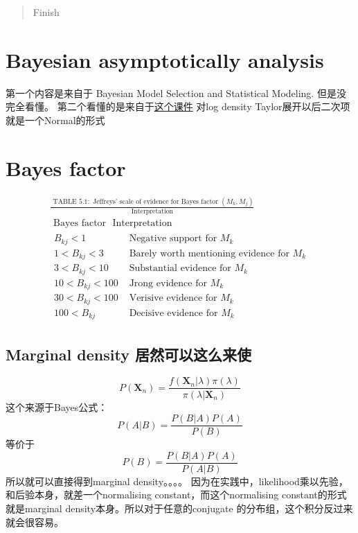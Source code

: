 \documentclass[
]{book}
\theoremstyle{definition}
\theoremstyle{definition}
\theoremstyle{definition}
\theoremstyle{remark}
\begin{document}
\begin{quote}
Finish
\end{quote}

\hypertarget{bayesian-asymptotically-analysis}{%
\section{Bayesian asymptotically analysis}\label{bayesian-asymptotically-analysis}}

第一个内容是来自于 Bayesian Model Selection and Statistical Modeling.
但是没完全看懂。
第二个看懂的是来自于\href{https://www.stat.unipd.it/sites/default/files/bayesian-mod2.pdf}{这个课件} 对log density Taylor展开以后二次项就是一个Normal的形式

\hypertarget{bayes-factor}{%
\section{Bayes factor}\label{bayes-factor}}

\[
\begin{array}{c}{\frac{\text { TABLE } 5.1: \text { Jeffreys' scale of evidence for Bayes factor }\left(M_{k}, M_{j}\right)}{\text { Interpretation }}} \\ {\text { Bayes factor }} {\text { Interpretation }} \\ {\begin{array}{cc}{B_{k j}<1} & {\text { Negative support for } M_{k}} \\ {1<B_{k j}<3} & {\text { Barely worth mentioning evidence for } M_{k}} \\ {3<B_{k j}<10} & {\text { Substantial evidence for } M_{k}} \\ {10<B_{k j}<100} & {\text { Jrong evidence for } M_{k}} \\ {30<B_{k j}<100} & {\text { Verisive evidence for } M_{k}} \\ {100<B_{k j}} & {\text { Decisive evidence for } M_{k}}\end{array}}\end{array}
\]

\hypertarget{marginal-density-ux5c45ux7136ux53efux4ee5ux8fd9ux4e48ux6765ux4f7f}{%
\subsection{Marginal density 居然可以这么来使}\label{marginal-density-ux5c45ux7136ux53efux4ee5ux8fd9ux4e48ux6765ux4f7f}}

\[
P\left(\boldsymbol{X}_{n}\right)=\frac{f\left(\boldsymbol{X}_{n} | \lambda\right) \pi(\lambda)}{\pi\left(\lambda | \boldsymbol{X}_{n}\right)}
\]
这个来源于Bayes公式：
\[
P(A | B)=\frac{P(B | A) P(A)}{P(B)}
\]
等价于
\[
P(B)=\frac{P(B | A) P(A)}{P(A | B)}
\]
所以就可以直接得到marginal density。。。。
因为在实践中，likelihood乘以先验，和后验本身，就差一个normalising constant，而这个normalising constant的形式就是marginal density本身。所以对于任意的conjugate 的分布组，这个积分反过来就会很容易。
\end{document}
